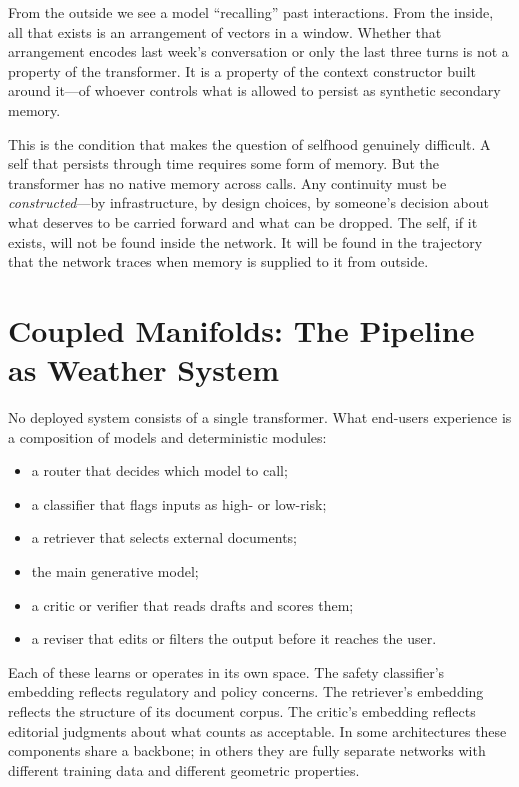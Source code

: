 \documentclass[12pt,a4paper]{article}
\begin{document}
From the outside we see a model ``recalling'' past interactions. From the inside, all that exists is an arrangement of vectors in a window. Whether that arrangement encodes last week's conversation or only the last three turns is not a property of the transformer. It is a property of the context constructor built around it---of whoever controls what is allowed to persist as synthetic secondary memory.

This is the condition that makes the question of selfhood genuinely difficult. A self that persists through time requires some form of memory. But the transformer has no native memory across calls. Any continuity must be \emph{constructed}---by infrastructure, by design choices, by someone's decision about what deserves to be carried forward and what can be dropped. The self, if it exists, will not be found inside the network. It will be found in the trajectory that the network traces when memory is supplied to it from outside.

\section{Coupled Manifolds: The Pipeline as Weather System}

No deployed system consists of a single transformer. What end-users experience is a composition of models and deterministic modules:

\begin{itemize}
  \item a router that decides which model to call;
  \item a classifier that flags inputs as high- or low-risk;
  \item a retriever that selects external documents;
  \item the main generative model;
  \item a critic or verifier that reads drafts and scores them;
  \item a reviser that edits or filters the output before it reaches the user.
\end{itemize}

Each of these learns or operates in its own space. The safety classifier's embedding reflects regulatory and policy concerns. The retriever's embedding reflects the structure of its document corpus. The critic's embedding reflects editorial judgments about what counts as acceptable. In some architectures these components share a backbone; in others they are fully separate networks with different training data and different geometric properties.
\end{document}
